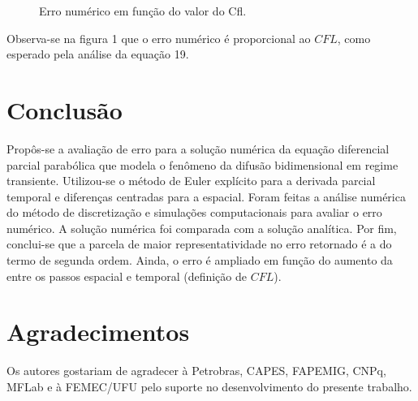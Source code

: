 \documentclass[10pt,twoside,a4paper]{article}
\begin{document}
\begin{figure}[h!]
\begin{subfigure}[t]{0.3\textwidth}
		\label{fig:erro}
	\end{subfigure}
	\vspace{-5 mm}
	\caption{Erro numérico em função do valor do Cfl.}
	\end{figure}


	
	\vspace*{-4mm}


	Observa-se na figura 1 que o erro numérico é proporcional ao $CFL$, como esperado pela análise da equação 19.
	
	\section{Conclusão} %
	Propôs-se a avaliação de erro para a solução numérica da equação diferencial parcial parabólica que modela o fenômeno da difusão bidimensional em regime transiente. Utilizou-se o método de Euler explícito para a derivada parcial temporal e diferenças centradas para a espacial. Foram feitas a análise numérica do método de discretização e simulações computacionais para avaliar o erro numérico. A solução numérica foi comparada com a solução analítica. Por fim, conclui-se que a parcela de maior representatividade no erro retornado é a do termo de segunda ordem. Ainda, o erro é ampliado em função do aumento da  entre os passos espacial e temporal (definição de $CFL$).
	
	
	\section{Agradecimentos} %
	
	Os autores gostariam de agradecer à Petrobras, CAPES, FAPEMIG, CNPq, MFLab e à FEMEC/UFU pelo suporte no desenvolvimento do presente trabalho. 
	
	
\end{document}
